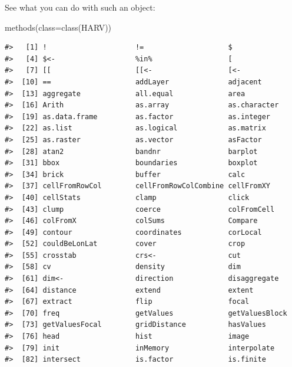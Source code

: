 \documentclass[
  11pt,
]{book}
\newenvironment{Shaded}{\begin{snugshade}}{\end{snugshade}}
\newcommand{\AttributeTok}[1]{\textcolor[rgb]{0.77,0.63,0.00}{#1}}
\newcommand{\FunctionTok}[1]{\textcolor[rgb]{0.00,0.00,0.00}{#1}}
\newcommand{\NormalTok}[1]{#1}
\begin{document}
See what you can do with such an object:

\begin{Shaded}
\begin{Highlighting}[]
\FunctionTok{methods}\NormalTok{(}\AttributeTok{class=}\FunctionTok{class}\NormalTok{(HARV))}
\end{Highlighting}
\end{Shaded}

\begin{verbatim}
#>   [1] !                     !=                    $                    
#>   [4] $<-                   %in%                  [                    
#>   [7] [[                    [[<-                  [<-                  
#>  [10] ==                    addLayer              adjacent             
#>  [13] aggregate             all.equal             area                 
#>  [16] Arith                 as.array              as.character         
#>  [19] as.data.frame         as.factor             as.integer           
#>  [22] as.list               as.logical            as.matrix            
#>  [25] as.raster             as.vector             asFactor             
#>  [28] atan2                 bandnr                barplot              
#>  [31] bbox                  boundaries            boxplot              
#>  [34] brick                 buffer                calc                 
#>  [37] cellFromRowCol        cellFromRowColCombine cellFromXY           
#>  [40] cellStats             clamp                 click                
#>  [43] clump                 coerce                colFromCell          
#>  [46] colFromX              colSums               Compare              
#>  [49] contour               coordinates           corLocal             
#>  [52] couldBeLonLat         cover                 crop                 
#>  [55] crosstab              crs<-                 cut                  
#>  [58] cv                    density               dim                  
#>  [61] dim<-                 direction             disaggregate         
#>  [64] distance              extend                extent               
#>  [67] extract               flip                  focal                
#>  [70] freq                  getValues             getValuesBlock       
#>  [73] getValuesFocal        gridDistance          hasValues            
#>  [76] head                  hist                  image                
#>  [79] init                  inMemory              interpolate          
#>  [82] intersect             is.factor             is.finite            

\end{verbatim}
\end{document}
